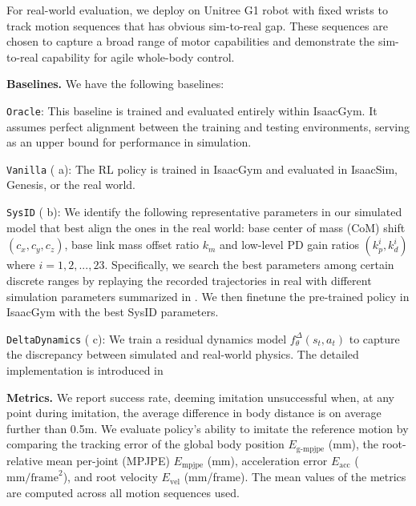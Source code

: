 For real-world evaluation, we deploy \method on Unitree G1 robot with fixed wrists to track motion sequences that has obvious sim-to-real gap. These sequences are chosen to capture a broad range of motor capabilities and demonstrate the sim-to-real capability for agile whole-body control.




\textbf{Baselines.} We have the following baselines:



\texttt{Oracle}: This baseline is trained and evaluated entirely within IsaacGym. It assumes perfect alignment between the training and testing environments, serving as an upper bound for performance in simulation.

\texttt{Vanilla} ( a): The RL policy is trained in IsaacGym and evaluated in IsaacSim, Genesis, or the real world.

\texttt{SysID} ( b): 
We identify the following representative parameters in our simulated model that best align the ones in the real world: base center of mass (CoM) shift $(c_x, c_y, c_z)$, base link mass offset ratio $k_m$ and low-level PD gain ratios $(k^i_p, k^i_d)$ where $i=1,2,...,23$. Specifically, we search the best parameters among certain discrete ranges by replaying the recorded trajectories in real with different simulation parameters summarized in . We then finetune the pre-trained policy in IsaacGym with the best SysID parameters.



\texttt{DeltaDynamics} ( c): We train a residual dynamics model $f^\Delta_{\theta}(s_t, a_t)$ to capture the discrepancy between simulated and real-world physics. The detailed implementation is introduced in~




\textbf{Metrics.}
We report success rate, deeming imitation unsuccessful when, at any point during imitation, the average difference in body distance is on average further than 0.5m.
We evaluate policy’s ability to imitate the reference motion by comparing the tracking error of the global body position $E_\text{g-mpjpe}$ (mm), the root-relative mean per-joint (MPJPE) $E_{\text{mpjpe}}$ (mm), acceleration error $E_\text{acc}$ ($\text{mm/frame}^2$), and root velocity $E_\text{vel}$ (mm/frame). The mean values of the metrics are computed across all motion sequences used.



